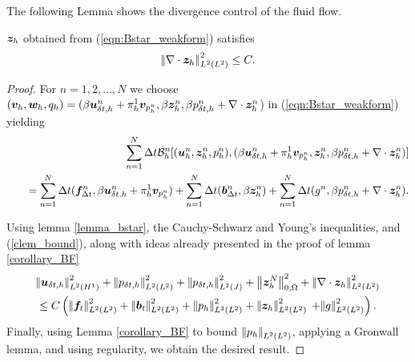 The following Lemma shows the divergence control of the fluid flow.
\begin{lemma}
\label{corollary_Bstar}
$ \boldsymbol{z}_{h}$ obtained from (\ref{eqn:Bstar_weakform}) satisfies
\begin{equation*}
 {\left\vert\kern-0.25ex\left\vert \nabla \cdot \boldsymbol{z}_{h}\right\vert\kern-0.25ex\right\vert}_{L^{2}(L^{2})}^{2} \leq C.
\end{equation*}
\end{lemma}
\begin{proof}

For $n = 1,2, \ldots , N$ we choose $(\boldsymbol{v}_{h},\boldsymbol{w}_{h},{q}_{h}) = (\beta {\boldsymbol{u}_{\delta t,h}^{n}} + \pi_{h}^{1} \boldsymbol{v}_{p_h^n},   \beta \boldsymbol{z}_{h}^{n},   \beta {{p}_{\delta t,h}^{n}} + \nabla \cdot \boldsymbol{z}_{h}^{n} $) in (\ref{eqn:Bstar_weakform})  yielding
\begin{eqnarray*}
&&\sum^{N}_{n=1} \Delta t \mathcal{B}_{h}^{n}[(\boldsymbol{u}_{h}^{n},\boldsymbol{z}_{h}^{n},p_h^{n}),(\beta {\boldsymbol{u}_{\delta t,h}^{n}} + \pi_{h}^{1} \boldsymbol{v}_{p_h^n}, \boldsymbol{z}_{h}^{n} ,\beta {{p}_{\delta t,h}^{n}} + \nabla \cdot \boldsymbol{z}_{h}^{n})]  \\
&& \quad =  \sum^{N}_{n=1} \Delta t (\boldsymbol{f}^{n}_{\Delta t},\beta {\boldsymbol{u}_{\delta t,h}^{n}} + \pi_{h}^{1} \boldsymbol{v}_{p_h^n}) + \sum^{N}_{n=1} \Delta t (\boldsymbol{b}^{n}_{\Delta t},\beta\boldsymbol{z}_{h}^{n}) +\sum^{N}_{n=1} \Delta t(g^{n},\beta{{p}_{\delta t,h}^{n}}+ \nabla \cdot \boldsymbol{z}_{h}^{n}).
\end{eqnarray*}

Using lemma \ref{lemma_bstar}, the Cauchy-Schwarz and Young's inequalities, and (\ref{clem_bound}), along with ideas already presented in the proof of lemma \ref{corollary_BF}
\begin{multline*}\honetimenorm{\dispdisctimedisc}^{2} +  \ltwotimenorm{\pdisctimedisc}^{2} +   \jtimenorm{\pdisctimedisc}^{2}  +  \ltwonorm{\fluxdisc^{N}}^{2}
+ \ltwotimenorm{\nabla \cdot \fluxdisc}^{2} \\
\leq  C \left(  \ltwotimecontnorm{{\mathbf{f}}_{t}}^{2} +   \ltwotimecontnorm{{\mathbf{b}}_{t}}^{2}  +  \ltwotimenorm{\pdisc}^{2}  +\ltwotimenorm{\fluxdisc}^{2} \right.  \left. +   \ltwotimecontnorm{{g}}^{2}  \right) .
\end{multline*}
Finally, using Lemma \ref{corollary_BF} to bound ${\left\vert\kern-0.25ex\left\vert p_h \right\vert\kern-0.25ex\right\vert}_{L^{2}(L^{2})}$, applying a Gronwall lemma, and using regularity, we obtain the desired result.

\end{proof}



